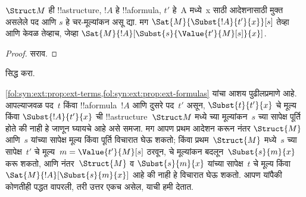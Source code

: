 \documentclass[../../../include/open-logic-section]{subfiles}
\begin{document}
\begin{prop} $\Struct M$ ही
!!a{structure}, $!A$ हे !!a{formula}, $t'$ हे~A मध्ये~x साठी
आदेशनासाठी मुक्त असलेले पद आणि $s$ हे चर-मूल्यांकन असू द्या. मग
$\Sat{M}{\Subst{!A}{t'}{x}}[s]$ तेव्हा आणि केवळ तेव्हाच, जेव्हा
$\Sat{M}{!A}[\Subst{s}{\Value{t'}{M}[s]}{x}]$.
%
\end{prop}

\begin{proof}
सराव.
\end{proof}

\begin{prob}
 सिद्ध करा.
\end{prob}

\begin{explain}
  \cref{fol:syn:ext:prop:ext-terms,fol:syn:ext:prop:ext-formulas} यांचा
  आशय पुढीलप्रमाणे आहे. आपल्याजवळ पद~$t$ किंवा !!a{formula}~$!A$ आणि
  दुसरे पद~$t'$ असून, $\Subst{t}{t'}{x}$ चे मूल्य किंवा
  $\Subst{!A}{t'}{x}$ ची !!a{structure}~$\Struct M$ मध्ये
  च्या मूल्यांकन~$s$ च्या सापेक्ष पूर्ति होते की नाही हे
  जाणून घ्यायचे आहे असे समजा. मग आपण प्रथम आदेशन करून नंतर
  $\Struct{M}$ आणि~$s$ यांच्या सापेक्ष मूल्य किंवा पूर्ति विचारात घेऊ
  शकतो; किंवा प्रथम~$\Struct{M}$ मध्ये~$s$ च्या सापेक्ष~$t'$ चे
  मूल्य~$m = \Value{t'}{M}[s]$ ठरवून, चे मूल्यांकन
  बदलून~$\Subst{s}{m}{x}$ करू शकतो, आणि नंतर~$\Struct{M}$ व
  $\Subst{s}{m}{x}$ यांच्या सापेक्ष~$t$ चे मूल्य किंवा
  $\Sat{M}{!A}[\Subst{s}{m}{x}]$ आहे की नाही हे विचारात घेऊ शकतो.
  आपण यांपैकी कोणतीही पद्धत वापरली, तरी उत्तर एकच असेल, याची हमी
  देतात.
\end{explain}
\end{document}
